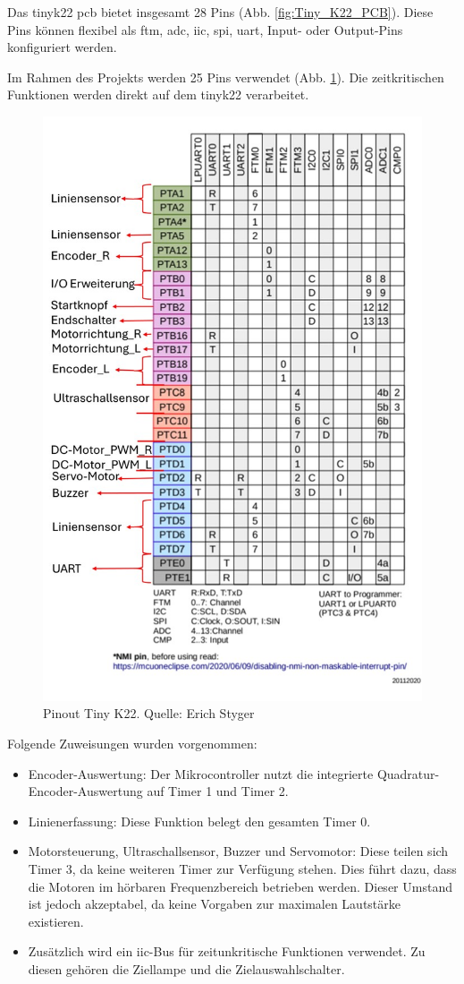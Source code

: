 Das \gls{tinyk22} \acrshort{pcb} bietet insgesamt 28 Pins (Abb. \ref{fig:Tiny_K22_PCB}). Diese Pins können flexibel als \acrfull{ftm}, \acrfull{adc}, \acrfull{iic}, \acrfull{spi}, \acrshort{uart}, Input- oder Output-Pins konfiguriert werden.

Im Rahmen des Projekts werden 25 Pins verwendet (Abb. \ref{fig:Tiny_K22_Pinout_definition}). Die zeitkritischen Funktionen werden direkt auf dem \gls{tinyk22} verarbeitet.

\begin{figure}[H]
    \centering
    \includegraphics[width=0.8\linewidth, angle=-90]{img/Tiny_K22_Pinout_definition.jpg}
    \caption{Pinout Tiny K22. Quelle: Erich Styger\cite{tiny-K22-Pinout}}
    \label{fig:Tiny_K22_Pinout_definition}
\end{figure}

Folgende Zuweisungen wurden vorgenommen:
\begin{itemize}
    \item Encoder-Auswertung: Der Mikrocontroller nutzt die integrierte Quadratur-Encoder-Auswertung auf Timer 1 und Timer 2.
    \item Linienerfassung: Diese Funktion belegt den gesamten Timer 0.
    \item Motorsteuerung, Ultraschallsensor, Buzzer und Servomotor: Diese teilen sich Timer 3, da keine weiteren Timer zur Verfügung stehen. Dies führt dazu, dass die Motoren im hörbaren Frequenzbereich betrieben werden. Dieser Umstand ist jedoch akzeptabel, da keine Vorgaben zur maximalen Lautstärke existieren.
    \item Zusätzlich wird ein \acrshort{iic}-Bus für zeitunkritische Funktionen verwendet. Zu diesen gehören die Ziellampe und die Zielauswahlschalter.
\end{itemize}

